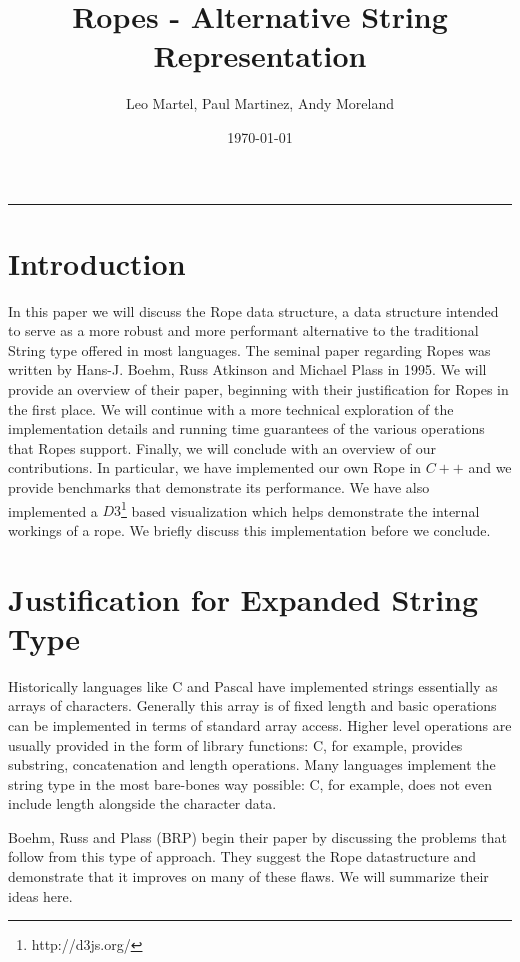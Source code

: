\documentclass[12pt]{article}
\title{Ropes - Alternative String Representation}
\author{Leo Martel, Paul Martinez, Andy Moreland}
\date{\today}
\begin{document}
\maketitle
\vspace{-0.3in}
\rule{\linewidth}{0.4pt}


\section{Introduction}

In this paper we will discuss the Rope data structure, a data structure intended to serve as a more robust and more performant alternative to the traditional String type offered in most languages.
The seminal paper regarding Ropes was written by Hans-J. Boehm, Russ Atkinson and Michael Plass in 1995.
We will provide an overview of their paper, beginning with their justification for Ropes in the first place.
We will continue with a more technical exploration of the implementation details and running time guarantees of the various operations that Ropes support.
Finally, we will conclude with an overview of our contributions. In particular, we have implemented our own Rope in $C++$ and we provide benchmarks that demonstrate its performance. We have also implemented a $D3$\footnote{http://d3js.org/} based visualization which helps demonstrate the internal workings of a rope. We briefly discuss this implementation before we conclude.

\section{Justification for Expanded String Type}

Historically languages like C and Pascal have implemented strings essentially as arrays of characters. Generally this array is of fixed length and basic operations can be implemented in terms of standard array access. Higher level operations are usually provided in the form of library functions: C, for example, provides substring, concatenation and length operations. Many languages implement the string type in the most bare-bones way possible: C, for example, does not even include length alongside the character data.

Boehm, Russ and Plass (BRP) begin their paper by discussing the problems that follow from this type of approach. They suggest the Rope datastructure and demonstrate that it improves on many of these flaws. We will summarize their ideas here.
\end{document}
